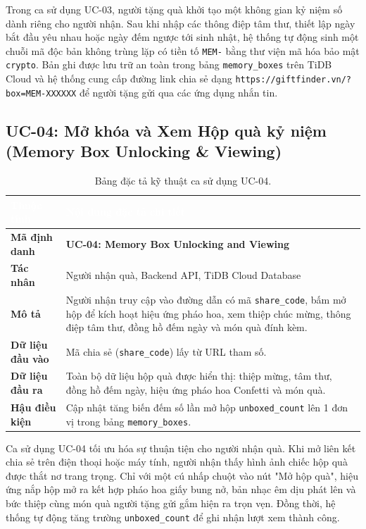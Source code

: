 Trong ca sử dụng UC-03, người tặng quà khởi tạo một không gian kỷ niệm số dành riêng cho người nhận. Sau khi nhập các thông điệp tâm thư, thiết lập ngày bắt đầu yêu nhau hoặc ngày đếm ngược tới sinh nhật, hệ thống tự động sinh một chuỗi mã độc bản không trùng lặp có tiền tố \texttt{MEM-} bằng thư viện mã hóa bảo mật \texttt{crypto}. Bản ghi được lưu trữ an toàn trong bảng \texttt{memory\_boxes} trên TiDB Cloud và hệ thống cung cấp đường link chia sẻ dạng \texttt{https://giftfinder.vn/?box=MEM-XXXXXX} để người tặng gửi qua các ứng dụng nhắn tin.

\subsection{UC-04: Mở khóa và Xem Hộp quà kỷ niệm (Memory Box Unlocking \& Viewing)}

\begin{table}[htbp]
\centering
\caption{Bảng đặc tả kỹ thuật ca sử dụng UC-04.}
\label{tab:spec_uc04}
\small
\renewcommand{\arraystretch}{1.2}
\begin{tabularx}{\textwidth}{|p{3.2cm}|X|}
\hline
\rowcolor{PrimaryBlue}
\textcolor{white}{\textbf{Thuộc tính}} & \textcolor{white}{\textbf{Nội dung đặc tả chi tiết}} \\
\hline
\textbf{Mã định danh} & \textbf{UC-04: Memory Box Unlocking and Viewing} \\
\hline
\textbf{Tác nhân} & Người nhận quà, Backend API, TiDB Cloud Database \\
\hline
\textbf{Mô tả} & Người nhận truy cập vào đường dẫn có mã \texttt{share\_code}, bấm mở hộp để kích hoạt hiệu ứng pháo hoa, xem thiệp chúc mừng, thông điệp tâm thư, đồng hồ đếm ngày và món quà đính kèm. \\
\hline
\textbf{Dữ liệu đầu vào} & Mã chia sẻ (\texttt{share\_code}) lấy từ URL tham số. \\
\hline
\textbf{Dữ liệu đầu ra} & Toàn bộ dữ liệu hộp quà được hiển thị: thiệp mừng, tâm thư, đồng hồ đếm ngày, hiệu ứng pháo hoa Confetti và món quà. \\
\hline
\textbf{Hậu điều kiện} & Cập nhật tăng biến đếm số lần mở hộp \texttt{unboxed\_count} lên 1 đơn vị trong bảng \texttt{memory\_boxes}. \\
\hline
\end{tabularx}
\end{table}

Ca sử dụng UC-04 tối ưu hóa sự thuận tiện cho người nhận quà. Khi mở liên kết chia sẻ trên điện thoại hoặc máy tính, người nhận thấy hình ảnh chiếc hộp quà được thắt nơ trang trọng. Chỉ với một cú nhấp chuột vào nút "Mở hộp quà", hiệu ứng nắp hộp mở ra kết hợp pháo hoa giấy bung nở, bản nhạc êm dịu phát lên và bức thiệp cùng món quà người tặng gửi gắm hiện ra trọn vẹn. Đồng thời, hệ thống tự động tăng trường \texttt{unboxed\_count} để ghi nhận lượt xem thành công.

